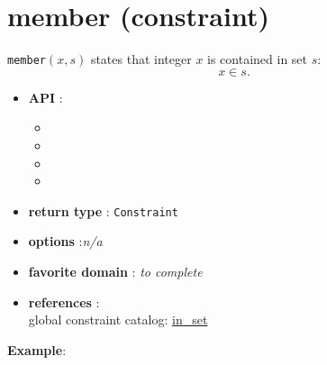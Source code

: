 \label{member}
\hypertarget{member}{}

\section{member (constraint)}\label{member:memberconstraint}\hypertarget{member:memberconstraint}{}

\begin{notedef}
  \texttt{member}$(x,s)$ states that integer $x$ is contained in set
  $s$:
$$x\in s.$$
\end{notedef}

\begin{itemize}
	\item \textbf{API} :
	\begin{itemize}
		\item {}
		\item {}
		\item {}
		\item {}
	\end{itemize}
	\item \textbf{return type} : \texttt{Constraint}
	\item \textbf{options} :\emph{n/a}
	\item \textbf{favorite domain} : \emph{to complete}
	\item \textbf{references} :\\
      global constraint catalog: \href{http://www.emn.fr/x-info/sdemasse/gccat/Cin_set.html}{in\_set}
\end{itemize}

\textbf{Example}:

